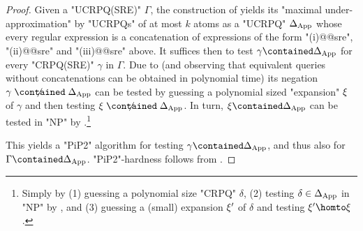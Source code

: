 \begin{proof}
	Given a "UCRPQ(SRE)" $\Gamma$, the construction of  yields its "maximal under-approximation" by "UCRPQs" of at most $k$ atoms as a "UCRPQ" $\Delta_{\textnormal{App}}$ whose every regular expression is a concatenation of expressions of the form "(i)@@sre", "(ii)@@sre" and "(iii)@@sre" above.
	It suffices then to test $\gamma \contained \Delta_{\textnormal{App}}$ for every "CRPQ(SRE)" $\gamma$ in $\Gamma$. Due to 
	(and observing that equivalent queries without concatenations can be obtained in polynomial time)
	its negation $\gamma \centernot{\contained} \Delta_{\textnormal{App}}$ can be tested by guessing a polynomial sized "expansion" $\xi$ of $\gamma$ and then testing $\anexpansion \centernot{\contained} \Delta_{\textnormal{App}}$.
	In turn, $\anexpansion \contained \Delta_{\textnormal{App}}$ can be tested in "NP" by 
	\cite[Theorem 4.2]{FigueiraGKMNT20}.\footnote{Simply by (1) guessing a polynomial size "CRPQ" $\delta$, (2) testing $\delta \in \Delta_{\textnormal{App}}$ in "NP" by , and (3) guessing a (small) expansion $\xi'$ of $\delta$ and testing $\anexpansion' \homto \anexpansion$.}

	This yields a "PiP2" algorithm for testing $\gamma \contained \Delta_{\textnormal{App}}$, and thus also for $\Gamma \contained \Delta_{\textnormal{App}}$.
	"PiP2"-hardness follows from .
\end{proof}

